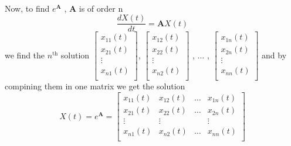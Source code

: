 \\
Now, to find $e^{\mathbf{A}}$ , $\mathbf{A}$ is of order n
\[
    \frac{dX(t)}{dt}   = \mathbf{A}X(t)
\]
we find the $n^{\text{th}}$ solution
$
    \begin{bmatrix}
        x_{11}(t) \\
        x_{21}(t) \\
        \vdots    \\
        x_{n1}(t) \\
    \end{bmatrix}
$,
$
    \begin{bmatrix}
        x_{12}(t) \\
        x_{22}(t) \\
        \vdots    \\
        x_{n2}(t) \\
    \end{bmatrix}
$
,
$\dots$
,
$
    \begin{bmatrix}
        x_{1n}(t) \\
        x_{2n}(t) \\
        \vdots    \\
        x_{nn}(t) \\
    \end{bmatrix}
$
and by compining them in one matrix we get the solution
\[
    X(t) = e^{\mathbf{A}} = \begin{bmatrix}
        x_{11}(t) & x_{12}(t) & \dots & x_{1n}(t) \\
        x_{21}(t) & x_{22}(t) & \dots & x_{2n}(t) \\
        \vdots    & \vdots    &       & \vdots    \\
        x_{n1}(t) & x_{n2}(t) & \dots & x_{nn}(t) \\
    \end{bmatrix}
\]

